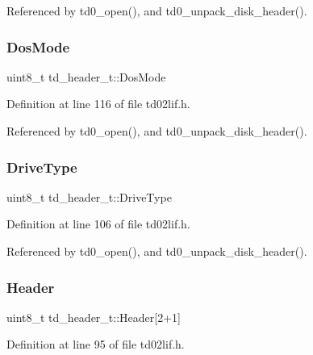 Referenced by td0\+\_\+open(), and td0\+\_\+unpack\+\_\+disk\+\_\+header().

\mbox{\label{structtd__header__t_acb0710bd6f98290ea2490ce678b63894}} 
\subsubsection{\texorpdfstring{Dos\+Mode}{DosMode}}
{\footnotesize\ttfamily uint8\+\_\+t td\+\_\+header\+\_\+t\+::\+Dos\+Mode}



Definition at line 116 of file td02lif.\+h.



Referenced by td0\+\_\+open(), and td0\+\_\+unpack\+\_\+disk\+\_\+header().

\mbox{\label{structtd__header__t_a865bd11809e67fd4ca8f1af0c46d9600}} 
\subsubsection{\texorpdfstring{Drive\+Type}{DriveType}}
{\footnotesize\ttfamily uint8\+\_\+t td\+\_\+header\+\_\+t\+::\+Drive\+Type}



Definition at line 106 of file td02lif.\+h.



Referenced by td0\+\_\+open(), and td0\+\_\+unpack\+\_\+disk\+\_\+header().

\mbox{\label{structtd__header__t_a41510629d6bb7852f4e1e43443c38edd}} 
\subsubsection{\texorpdfstring{Header}{Header}}
{\footnotesize\ttfamily uint8\+\_\+t td\+\_\+header\+\_\+t\+::\+Header\mbox{[}2+1\mbox{]}}



Definition at line 95 of file td02lif.\+h.




